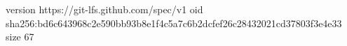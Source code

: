 version https://git-lfs.github.com/spec/v1
oid sha256:bd6c643968c2e590bb93b8e1f4c5a7c6b2dcfef26c28432021cd37803f3e4e33
size 67
